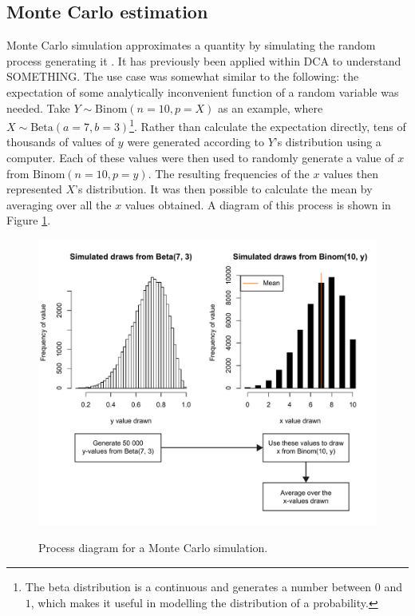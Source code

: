 \documentclass[11pt,a4paper,article]{memoir} %
\begin{document}
\subsection*{Monte Carlo estimation}
Monte Carlo simulation approximates a quantity by simulating the random process generating it . It has previously been applied within DCA to understand SOMETHING. The use case was somewhat similar to the following: the expectation of some analytically inconvenient function of a random variable was needed. Take $Y \sim \text{Binom}(n = 10, p = X)$ as an example, where $X \sim \text{Beta}(a = 7, b = 3)$\footnote{The beta distribution is a continuous and generates a number between $0$ and $1$, which makes it useful in modelling the distribution of a probability.}. Rather than calculate the expectation directly, tens of thousands of values of $y$ were generated according to $Y$'s distribution using a computer. Each of these values were then used to randomly generate a value of $x$ from $\text{Binom}(n = 10, p = y)$. The resulting frequencies of the $x$ values then represented $X$'s distribution. It was then possible to calculate the mean by averaging over all the $x$ values obtained. A diagram of this process is shown in Figure \ref{fig:monte_carlo}.
\begin{figure}
\includegraphics[width=\textwidth]{monte_carlo_simulation.pdf}
\label{fig:monte_carlo}
\caption{Process diagram for a Monte Carlo simulation.}
\end{figure}
\end{document}
